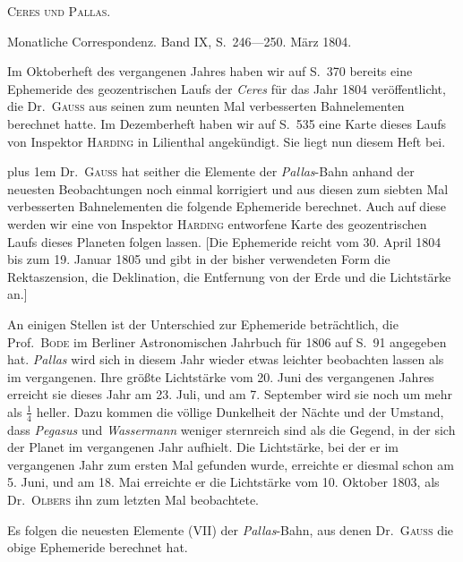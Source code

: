 \centerline{\textsc{Ceres und Pallas.}}

\medskip
Monatliche Correspondenz. Band IX, S.\ 246—250. März 1804.

\medskip
Im Oktoberheft des vergangenen Jahres haben wir auf S.\ 370 bereits eine Ephemeride des geozentrischen Laufs der \emph{Ceres} für das Jahr 1804 veröffentlicht, die Dr.\ \textsc{Gauß} aus seinen zum neunten Mal verbesserten Bahnelementen berechnet hatte. Im Dezemberheft haben wir auf S.\ 535 eine Karte dieses Laufs von Inspektor \textsc{Harding} in Lilienthal angekündigt. Sie liegt nun diesem Heft bei.

{\rightskip=0pt plus 1em
Dr.\ \textsc{Gauß} hat seither die Elemente der \emph{Pallas}-Bahn anhand der neuesten Beobachtungen noch einmal korrigiert und aus diesen zum siebten Mal verbesserten Bahnelementen die folgende Ephemeride berechnet. Auch auf diese werden wir eine von Inspektor \textsc{Harding} entworfene Karte des geozentrischen Laufs dieses Planeten folgen lassen. [Die Ephemeride reicht vom 30. April 1804 bis zum 19. Januar 1805 und gibt in der bisher verwendeten Form die Rektaszension, die Deklination, die Entfernung von der Erde und die Lichtstärke an.]\par}


An einigen Stellen ist der Unterschied zur Ephemeride beträchtlich, die Prof.\ \textsc{Bode} im Berliner Astronomischen Jahrbuch für 1806 auf S.\ 91 angegeben hat. \emph{Pallas} wird sich in diesem Jahr wieder etwas leichter beobachten lassen als im vergangenen. Ihre größte Lichtstärke vom 20. Juni des vergangenen Jahres erreicht sie dieses Jahr am 23. Juli, und am 7. September wird sie noch um mehr als $\frac{1}{4}$ heller. Dazu kommen die völlige Dunkelheit der Nächte und der Umstand, dass \emph{Pegasus} und \emph{Wassermann} weniger sternreich sind als die Gegend, in der sich der Planet im vergangenen Jahr aufhielt. Die Lichtstärke, bei der er im vergangenen Jahr zum ersten Mal gefunden wurde, erreichte er diesmal schon am 5. Juni, und am 18. Mai erreichte er die Lichtstärke vom 10. Oktober 1803, als Dr.\ \textsc{Olbers} ihn zum letzten Mal beobachtete.

Es folgen die neuesten Elemente (VII) der \emph{Pallas}-Bahn, aus denen Dr.\ \textsc{Gauß} die obige Ephemeride berechnet hat.

